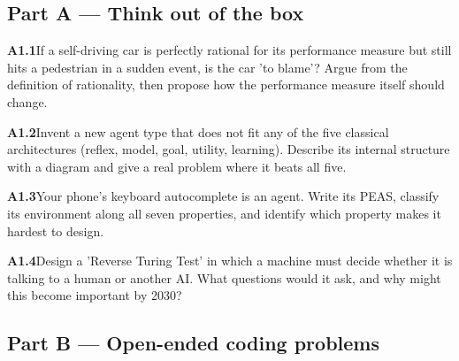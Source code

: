 \documentclass[11pt]{article}
\begin{document}
\subsection*{\color{navy}Part A --- Think out of the box}
\begin{tcolorbox}[enhanced,colback=goldL,colframe=gold!80!black,arc=2mm,boxrule=0.8pt,left=3mm]
\textbf{\color{navy}A1.1}\quad If a self-driving car is perfectly rational for its performance measure but still hits a pedestrian in a sudden event, is the car 'to blame'? Argue from the definition of rationality, then propose how the performance measure itself should change.\hfill{}
\end{tcolorbox}
\begin{tcolorbox}[enhanced,colback=goldL,colframe=gold!80!black,arc=2mm,boxrule=0.8pt,left=3mm]
\textbf{\color{navy}A1.2}\quad Invent a new agent type that does not fit any of the five classical architectures (reflex, model, goal, utility, learning). Describe its internal structure with a diagram and give a real problem where it beats all five.\hfill{}
\end{tcolorbox}
\begin{tcolorbox}[enhanced,colback=goldL,colframe=gold!80!black,arc=2mm,boxrule=0.8pt,left=3mm]
\textbf{\color{navy}A1.3}\quad Your phone's keyboard autocomplete is an agent. Write its PEAS, classify its environment along all seven properties, and identify which property makes it hardest to design.\hfill{}
\end{tcolorbox}
\begin{tcolorbox}[enhanced,colback=goldL,colframe=gold!80!black,arc=2mm,boxrule=0.8pt,left=3mm]
\textbf{\color{navy}A1.4}\quad Design a 'Reverse Turing Test' in which a machine must decide whether it is talking to a human or another AI. What questions would it ask, and why might this become important by 2030?\hfill{}
\end{tcolorbox}
\subsection*{\color{navy}Part B --- Open-ended coding problems}
\end{document}
